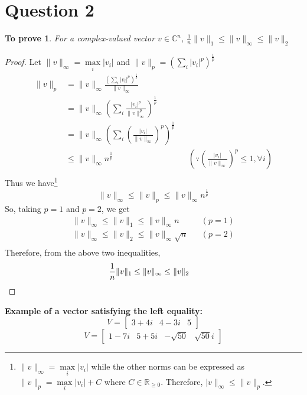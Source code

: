 \documentclass[11pt, oneside]{article}
\newtheorem*{remark}{To prove}
\begin{document}
\section*{Question 2}
  \begin{remark}
    For a complex-valued vector $v \in \mathbb{C}^n$, $\frac{1}{n}\|v\|_1 \leq \|v\|_{\infty} \leq \|v\|_2$
  \end{remark}
  \begin{proof}
    Let $\|v\|_{\infty} = \max\limits_i |v_i|$ and $\|v\|_p = \left(\sum\limits_i |v_i|^p \right)^{\frac{1}{p}}$
    \begin{align*}
      \|v\|_p &= \|v\|_{\infty} \frac{\left(\sum_i |v_i|^p\right)^{\frac{1}{p}}}{\|v\|_{\infty}} \\
              &= \|v\|_{\infty} \left(\sum_i\frac{|v_i|^p}{\|v\|_{\infty}^p}\right)^{\frac{1}{p}} \\
              &= \|v\|_{\infty} \left(\sum_i \left(\frac{|v_i|}{\|v\|_{\infty}}\right)^{p}\right)^{\frac{1}{p}} \\
              &\leq \|v\|_{\infty} n^{\frac{1}{p}} && \left(\because \left(\frac{|v_i|}{\|v\|_{\infty}}\right)^p \leq 1, \forall i\right) \\
    \end{align*}
    Thus we have\footnote{$\|v\|_{\infty} = \max\limits_i |v_i|$ while the other norms can be expressed as $\|v\|_{p} = \max\limits_i |v_i| + C$ where $C \in \mathbb{R}_{\ge 0}$. Therefore, $|v\|_{\infty} \leq \|v\|_{p}$.}
    \begin{equation*}
      \|v\|_{\infty} \leq \|v\|_{p} \leq \|v\|_{\infty} n^{\frac{1}{p}}
    \end{equation*}
    So, taking $p=1$ and $p=2$, we get
    \begin{align*}
      \|v\|_{\infty} \leq \|v\|_{1} \leq \|v\|_{\infty} n && (p=1)\\
      \|v\|_{\infty} \leq \|v\|_{2} \leq \|v\|_{\infty} \sqrt{n} && (p=2)\\
    \end{align*}
    Therefore, from the above two inequalities,
    \begin{align*}
      \frac{1}{n}\|v\|_1 \leq \|v\|_{\infty} \leq \|v\|_2 && \qedhere
    \end{align*}
  \end{proof}

  \noindent\textbf{Example of a vector satisfying the left equality:} \begin{equation*}
    V = \begin{bmatrix}
      3 + 4 i & 4 - 3 i & 5
  \end{bmatrix}
  \end{equation*}
  \begin{equation*}
    V = \begin{bmatrix}
      1 - 7 i & 5 + 5 i & -\sqrt{50} & \sqrt{50}i
  \end{bmatrix}
  \end{equation*}
\end{document}
